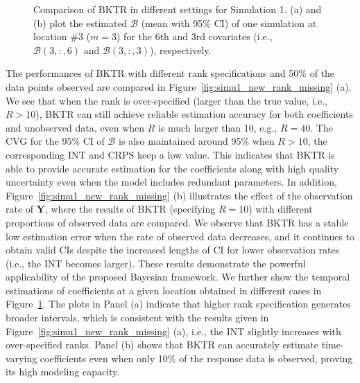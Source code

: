 \documentclass[12pt]{article}
\begin{document}
\begin{figure}[!t]
\centering
{}
\caption{Comparison of BKTR in different settings for Simulation 1. (a) and (b) plot the estimated $\boldsymbol{\mathcal{B}}$ (mean with 95\% CI) of one simulation at location \#3 ($m=3$) for the 6th and 3rd covariates (i.e., $\boldsymbol{\mathcal{B}}(3,:,6)\text{ and }\boldsymbol{\mathcal{B}}(3,:,3)$), respectively.}
\label{fig:simu1_new_compare}
\end{figure}




The performances of BKTR with different rank specifications and 50\% of the data points observed are compared in Figure~\ref{fig:simu1_new_rank_missing} (a). We see that when the rank is over-specified (larger than the true value, i.e., $R>10$), BKTR can still achieve reliable estimation accuracy for both coefficients and unobserved data, even when $R$ is much larger than 10, e.g., $R=40$. The CVG for the 95\% CI of $\boldsymbol{\mathcal{B}}$ is also maintained around 95\% when $R>10$, the corresponding INT and CRPS keep a low value. This indicates that BKTR is able to provide accurate estimation for the coefficients along with high quality uncertainty even when the model includes redundant parameters. In addition, Figure~\ref{fig:simu1_new_rank_missing} (b) illustrates the effect of the observation rate of $\boldsymbol{Y}$, where the results of BKTR (specifying $R=10$) with different proportions of observed data  are compared. We observe that BKTR has a stable low estimation error when the rate of observed data decreases, and it continues to obtain valid CIs despite the increased lengths of CI for lower observation rates (i.e., the INT becomes larger). These results demonstrate the powerful applicability of the proposed Bayesian framework. 
We further show the temporal estimations of coefficients at a given location obtained in different cases in Figure~\ref{fig:simu1_new_compare}. The plots in Panel (a) indicate that higher rank specification generates broader intervals, which is consistent with the results given in Figure~\ref{fig:simu1_new_rank_missing} (a), i.e., the INT slightly increases with over-specified ranks. Panel (b) shows that BKTR can accurately estimate time-varying coefficients even when only 10\% of the response data is observed, proving its high modeling capacity.
\end{document}
